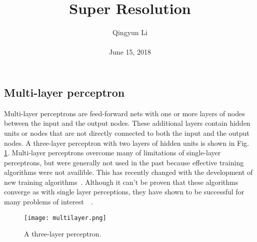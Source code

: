 \documentclass[10pt,twocolumn,letterpaper]{article}
\begin{document}
\author{Qingyun Li\\\\
June 15, 2018}        
\title{Super Resolution}

\maketitle

\subsection{Multi-layer perceptron}
\par Multi-layer perceptrons are feed-forward nets with one or more layers of nodes between the input and the output nodes. These additional layers contain hidden units or nodes that are not directly connected to both the input and the output nodes. A three-layer perceptron with two layers of hidden units is shown in Fig. \ref{multi}. Multi-layer perceptrons overcome many of limitations of single-layer perceptrons, but were generally not used in the past because effective training algorithms were not availible. This has recently changed with the development of new training algorithms~\cite{Rumelhart1988Learning}. Although it can't be proven that these algorithms converge as with single layer perceptions, they have shown to be successful for many problems of interest~\cite{Rumelhart1988Learning}~\cite{Li2016Underwater}.
\begin{figure}[htbp]
 \centering{}
\texttt{[image: multilayer.png]}\\
 \caption{A three-layer perceptron.}
\label{multi}
\end{figure}
 
 
\end{document}

